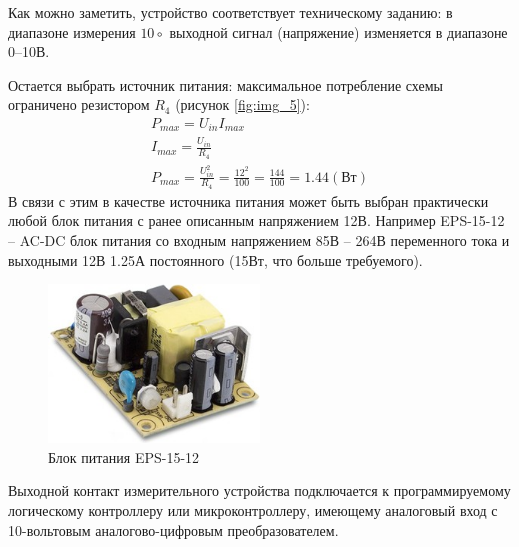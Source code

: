 Как можно заметить, устройство соответствует техническому заданию: в диапазоне измерения $10\circ$ выходной сигнал (напряжение) изменяется в диапазоне 0--10В.

Остается выбрать источник питания: максимальное потребление схемы ограничено резистором $R_4$ (рисунок \ref{fig:img_5}):
\begin{gather*}
    P_{max} = U_{in}I_{max}\\
    I_{max} = \frac{U_{in}}{R_4}\\
    P_{max} = \frac{U^2_{in}}{R_4} = \frac{12^2}{100} = \frac{144}{100}=1.44(\text{Вт})
\end{gather*}
В связи с этим в качестве источника питания может быть выбран практически любой блок питания с ранее описанным напряжением 12В.
Например EPS-15-12 -- AC-DC блок питания со входным напряжением 85В -- 264В переменного тока и выходными 12В 1.25А постоянного (15Вт, что больше требуемого).
\begin{figure}[!h]
    \centering
    \includegraphics[width=0.5\textwidth]{img/img_8}
    \caption{Блок питания EPS-15-12}
    \label{fig:img_8}
\end{figure}

Выходной контакт измерительного устройства подключается к программируемому логическому контроллеру или микроконтроллеру, имеющему аналоговый вход с 10-вольтовым аналогово-цифровым преобразователем.
\newpage